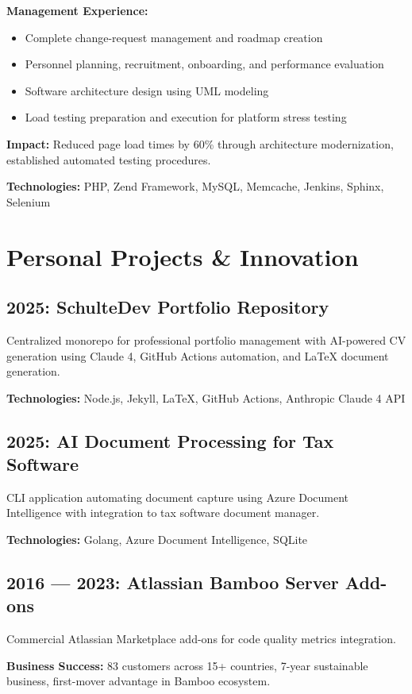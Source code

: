 \documentclass[11pt,a4paper]{article}
\begin{document}
\textbf{Management Experience:}
\begin{itemize}[leftmargin=12pt,topsep=0pt,itemsep=0pt]
\item Complete change-request management and roadmap creation
\item Personnel planning, recruitment, onboarding, and performance evaluation
\item Software architecture design using UML modeling
\item Load testing preparation and execution for platform stress testing
\end{itemize}

\textbf{Impact:} Reduced page load times by 60\% through architecture modernization, established automated testing procedures.

\textbf{Technologies:} PHP, Zend Framework, MySQL, Memcache, Jenkins, Sphinx, Selenium

\section{Personal Projects \& Innovation}

\subsection{2025: SchulteDev Portfolio Repository}
Centralized monorepo for professional portfolio management with AI-powered CV generation using Claude 4, GitHub Actions automation, and LaTeX document generation.

\textbf{Technologies:} Node.js, Jekyll, LaTeX, GitHub Actions, Anthropic Claude 4 API

\subsection{2025: AI Document Processing for Tax Software}
CLI application automating document capture using Azure Document Intelligence with integration to tax software document manager.

\textbf{Technologies:} Golang, Azure Document Intelligence, SQLite

\subsection{2016 — 2023: Atlassian Bamboo Server Add-ons}
Commercial Atlassian Marketplace add-ons for code quality metrics integration.

\textbf{Business Success:} 83 customers across 15+ countries, 7-year sustainable business, first-mover advantage in Bamboo ecosystem.
\end{document}
